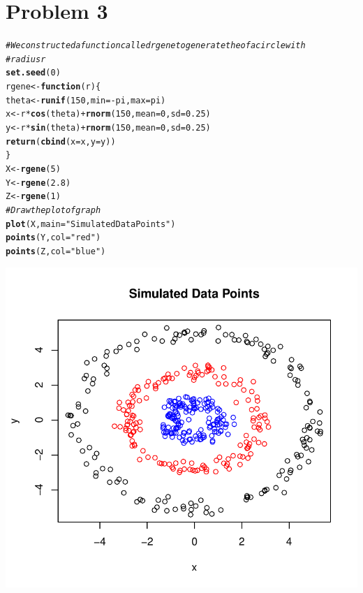 \documentclass{article}\usepackage[]{graphicx}\usepackage[]{color}
\makeatletter
\def\maxwidth{ %
  \ifdim\Gin@nat@width>\linewidth
    \linewidth
  \else
    \Gin@nat@width
  \fi
}
\newcommand{\hlnum}[1]{\textcolor[rgb]{0.686,0.059,0.569}{#1}}%
\newcommand{\hlstr}[1]{\textcolor[rgb]{0.192,0.494,0.8}{#1}}%
\newcommand{\hlcom}[1]{\textcolor[rgb]{0.678,0.584,0.686}{\textit{#1}}}%
\newcommand{\hlopt}[1]{\textcolor[rgb]{0,0,0}{#1}}%
\newcommand{\hlstd}[1]{\textcolor[rgb]{0.345,0.345,0.345}{#1}}%
\newcommand{\hlkwa}[1]{\textcolor[rgb]{0.161,0.373,0.58}{\textbf{#1}}}%
\newcommand{\hlkwb}[1]{\textcolor[rgb]{0.69,0.353,0.396}{#1}}%
\newcommand{\hlkwc}[1]{\textcolor[rgb]{0.333,0.667,0.333}{#1}}%
\newcommand{\hlkwd}[1]{\textcolor[rgb]{0.737,0.353,0.396}{\textbf{#1}}}%
\newenvironment{kframe}{%
 \def\at@end@of@kframe{}%
 \ifinner\ifhmode%
  \def\at@end@of@kframe{\end{minipage}}%
  \begin{minipage}{\columnwidth}%
 \fi\fi%
 \def\FrameCommand##1{\hskip\@totalleftmargin \hskip-\fboxsep
 \colorbox{shadecolor}{##1}\hskip-\fboxsep
     \hskip-\linewidth \hskip-\@totalleftmargin \hskip\columnwidth}%
 \MakeFramed {\advance\hsize-\width
   \@totalleftmargin\z@ \linewidth\hsize
   \@setminipage}}%
 {\par\unskip\endMakeFramed%
 \at@end@of@kframe}
\newenvironment{knitrout}{}{} %
\makeatother
\begin{document}
\section*{Problem 3}

\begin{knitrout}
\color{fgcolor}\begin{kframe}
\begin{alltt}
\hlcom{# We constructed a function called rgene to generate the of a circle with}
\hlcom{# radius r}
\hlkwd{set.seed}\hlstd{(}\hlnum{0}\hlstd{)}
\hlstd{rgene} \hlkwb{<-} \hlkwa{function}\hlstd{(}\hlkwc{r}\hlstd{) \{}
    \hlstd{theta} \hlkwb{<-} \hlkwd{runif}\hlstd{(}\hlnum{150}\hlstd{,} \hlkwc{min} \hlstd{=} \hlopt{-}\hlstd{pi,} \hlkwc{max} \hlstd{= pi)}
    \hlstd{x} \hlkwb{<-} \hlstd{r} \hlopt{*} \hlkwd{cos}\hlstd{(theta)} \hlopt{+} \hlkwd{rnorm}\hlstd{(}\hlnum{150}\hlstd{,} \hlkwc{mean} \hlstd{=} \hlnum{0}\hlstd{,} \hlkwc{sd} \hlstd{=} \hlnum{0.25}\hlstd{)}
    \hlstd{y} \hlkwb{<-} \hlstd{r} \hlopt{*} \hlkwd{sin}\hlstd{(theta)} \hlopt{+} \hlkwd{rnorm}\hlstd{(}\hlnum{150}\hlstd{,} \hlkwc{mean} \hlstd{=} \hlnum{0}\hlstd{,} \hlkwc{sd} \hlstd{=} \hlnum{0.25}\hlstd{)}
    \hlkwd{return}\hlstd{(}\hlkwd{cbind}\hlstd{(}\hlkwc{x} \hlstd{= x,} \hlkwc{y} \hlstd{= y))}
\hlstd{\}}
\hlstd{X} \hlkwb{<-} \hlkwd{rgene}\hlstd{(}\hlnum{5}\hlstd{)}
\hlstd{Y} \hlkwb{<-} \hlkwd{rgene}\hlstd{(}\hlnum{2.8}\hlstd{)}
\hlstd{Z} \hlkwb{<-} \hlkwd{rgene}\hlstd{(}\hlnum{1}\hlstd{)}
\hlcom{# Draw the plot of graph}
\hlkwd{plot}\hlstd{(X,} \hlkwc{main} \hlstd{=} \hlstr{"Simulated Data Points"}\hlstd{)}
\hlkwd{points}\hlstd{(Y,} \hlkwc{col} \hlstd{=} \hlstr{"red"}\hlstd{)}
\hlkwd{points}\hlstd{(Z,} \hlkwc{col} \hlstd{=} \hlstr{"blue"}\hlstd{)}
\end{alltt}
\end{kframe}

{\centering \includegraphics[width=\maxwidth]{figure/minimal-Problem_31} 

}
\end{knitrout}
\end{document}
